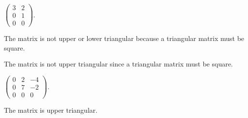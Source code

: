\documentclass{ximera}
\begin{document}
\begin{exercise} \label{c1.1.02d}
  $\left( \begin{array}{rr}
            3 & 2 \\
            0 & 1 \\
            0 & 0 \end{array} \right)$.
        \begin{multipleChoice}
        \end{multipleChoice}
        \begin{feedback}
          The matrix is not upper or lower triangular because a triangular
          matrix must be square.          
        \end{feedback}

\begin{solution}
The matrix is not upper triangular since a triangular
matrix must be square.


\end{solution}
\end{exercise}
\begin{exercise} \label{c1.1.02e}
  $\left( \begin{array}{rrr}
            0 & 2 & -4\\
            0 & 7 & -2\\
            0 & 0 & 0\end{array} \right)$.
        \begin{multipleChoice}
        \end{multipleChoice}
       

\begin{solution}
The matrix is upper triangular.

\end{solution}
\end{exercise}
\end{document}
